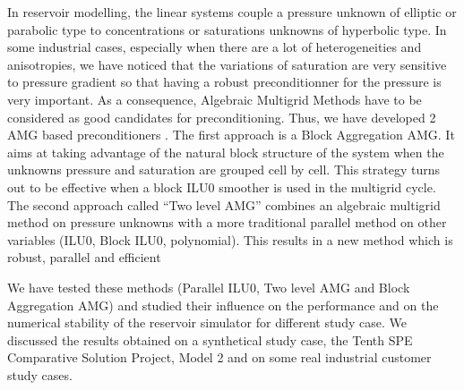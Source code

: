 \documentclass{report}
\begin{document}
In reservoir modelling, the linear systems couple a pressure unknown of
elliptic or parabolic type to concentrations or saturations unknowns of
hyperbolic type. In some industrial cases, especially when there are a
lot of heterogeneities and anisotropies, we have noticed that the
variations of saturation are very sensitive to pressure gradient so
that having a robust preconditionner for the pressure is very
important. As a consequence, Algebraic Multigrid Methods have to be
considered as good candidates for preconditioning. Thus, we have
developed 2 AMG based preconditioners . The first approach is a Block
Aggregation AMG. It aims at taking advantage of the natural block
structure of the system when the unknowns pressure and saturation are
grouped cell by cell. This strategy turns out to be effective when a
block ILU0 smoother is used in the multigrid cycle. The second approach
called ``Two level AMG'' combines an algebraic multigrid method on
pressure unknowns with a more traditional parallel method on other
variables (ILU0, Block ILU0, polynomial). This results in a new method
which is robust, parallel and efficient

We have tested these methods (Parallel ILU0, Two level AMG and Block
Aggregation AMG) and studied their influence on the performance and on
the numerical stability of the reservoir simulator for different study
case. We discussed the results obtained on a synthetical study case,
the Tenth SPE Comparative Solution Project, Model 2 and on some real
industrial customer study cases.
\end{document}
